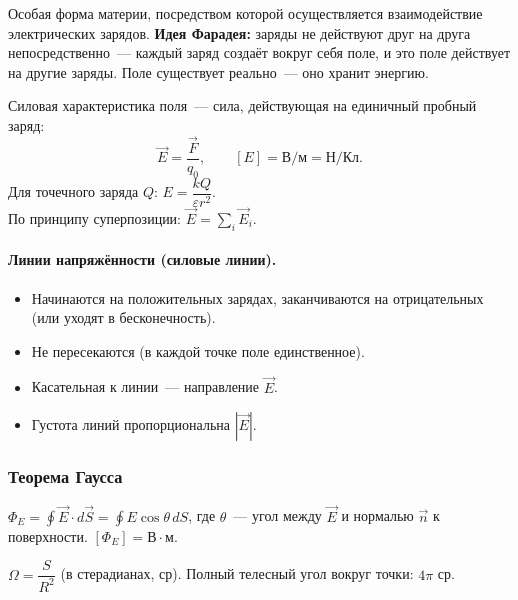 \documentclass[12pt]{article}
\begin{document}
\begin{definition}
	Особая форма материи, посредством которой осуществляется взаимодействие электрических зарядов. \textbf{Идея Фарадея:} заряды не действуют друг на друга непосредственно~--- каждый заряд создаёт вокруг себя поле, и это поле действует на другие заряды. Поле существует реально~--- оно хранит энергию.
\end{definition}

\begin{definition}
	Силовая характеристика поля~--- сила, действующая на единичный пробный заряд:
	\[
		\vec{E} = \frac{\vec{F}}{q_0}, \qquad [E] = \text{В/м} = \text{Н/Кл}.
	\]
	Для точечного заряда $Q$: $E = \dfrac{kQ}{\varepsilon r^2}$.\\
	По принципу суперпозиции: $\vec{E} = \sum_i \vec{E}_i$.
\end{definition}

\paragraph{Линии напряжённости (силовые линии).}
\begin{itemize}
	\item Начинаются на положительных зарядах, заканчиваются на отрицательных (или уходят в бесконечность).
	\item Не пересекаются (в каждой точке поле единственное).
	\item Касательная к линии~--- направление $\vec{E}$.
	\item Густота линий пропорциональна $|\vec{E}|$.
\end{itemize}

\subsubsection{Теорема Гаусса}

\begin{definition}
	$\Phi_E = \oint \vec{E} \cdot d\vec{S} = \oint E \cos\theta \, dS$, где $\theta$~--- угол между $\vec{E}$ и нормалью $\vec{n}$ к поверхности. $[\Phi_E] = \text{В}\cdot\text{м}$.
\end{definition}

\begin{definition}
	$\Omega = \dfrac{S}{R^2}$ (в стерадианах, ср). Полный телесный угол вокруг точки: $4\pi$ ср.
\end{definition}
\end{document}
